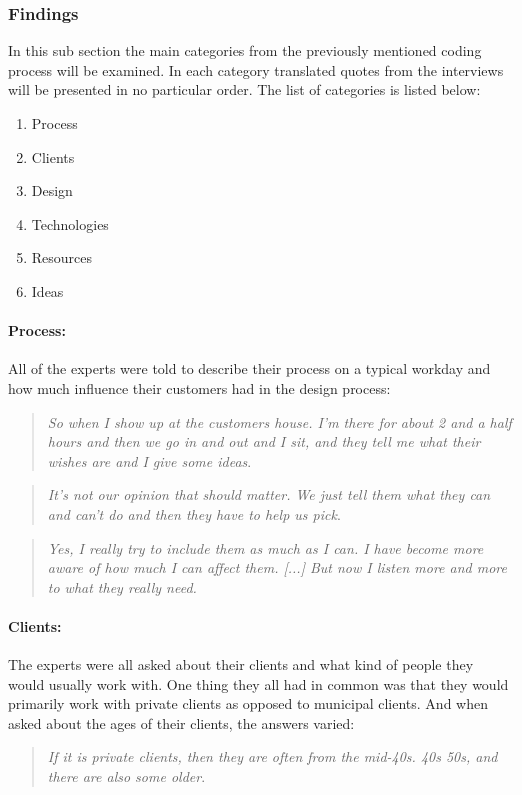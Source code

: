 		\subsubsection{Findings}
		In this sub section the main categories from the previously mentioned coding process will be examined. In each category translated quotes from the interviews will be presented in no particular order. The list of categories is listed below:
		
		\begin{enumerate}
			\item Process
			\item Clients
			\item Design
			\item Technologies
			\item Resources
			\item Ideas
		\end{enumerate}
		
		\paragraph*{Process:}
		All of the experts were told to describe their process on a typical workday and how  much influence their customers had in the design process:\\
		\begin{quote}
			\textit{So when I show up at the customers house. I'm there for about 2 and a half hours and then we go in and out and I sit, and they tell me what their wishes are and I give some ideas}\label{quote:expertProcess1}.\\
		\end{quote}
		
		\begin{quote}
			\textit{It's not our opinion that should matter. We just tell them what they can and can't do and then they have to help us pick}\label{quote:expertProcess2}.\\
		\end{quote}
		
		\begin{quote}
			\textit{Yes, I really try to include them as much as I can. I have become more aware of how much I can affect them. [...] But now I listen more and more to what they really need. }\label{quote:expertProcess3}\\
		\end{quote}
		
		\paragraph*{Clients:}
		The experts were all asked about their clients and what kind of people they would usually work with. One thing they all had in common was that they would primarily work with private clients as opposed to municipal clients. And when asked about the ages of their clients, the answers varied:\\
		\begin{quote}
			\textit{If it is private clients, then they are often from the mid-40s. 40s 50s, and there are also some older}\label{quote:expertClients1}.\\
		\end{quote}
		
